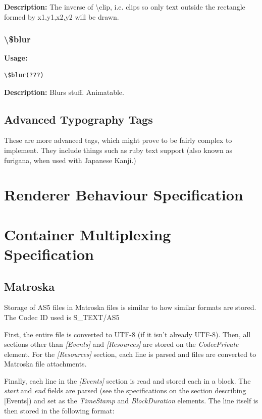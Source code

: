 \documentclass{spec}
\begin{document}
\textbf{Description:}
The inverse of \textbackslash clip, i.e. clips so only text outside the rectangle formed
by x1,y1,x2,y2 will be drawn.

\subsubsection{\textbackslash \$blur}
\textbf{Usage:}
\begin{verbatim}
\$blur(???)
\end{verbatim}

\textbf{Description:}
Blurs stuff. Animatable.


\subsection{Advanced Typography Tags}
These are more advanced tags, which might prove to be fairly complex to implement. They include
things such as ruby text support (also known as furigana, when used with Japanese Kanji.)



\newpage
\section{Renderer Behaviour Specification}


\newpage
\section{Container Multiplexing Specification}

\subsection{Matroska}
Storage of AS5 files in Matroska files is similar to how similar formats are stored.\cite{mkv ssa}
The Codec ID used is \textsc{S\_TEXT/AS5}

First, the entire file is converted to UTF-8 (if it isn't already UTF-8). Then, all sections other
than \emph{[Events]} and \emph{[Resources]} are stored on the \emph{CodecPrivate} element. For the
\emph{[Resources]} section, each line is parsed and files are converted to Matroska file attachments.

Finally, each line in the \emph{[Events]} section is read and stored each in a block. The \emph{start}
and \emph{end} fields are parsed (see the specifications on the section describing [Events]) and set
as the \emph{TimeStamp} and \emph{BlockDuration} elements. The line itself is then stored in the
following format:
\end{document}

